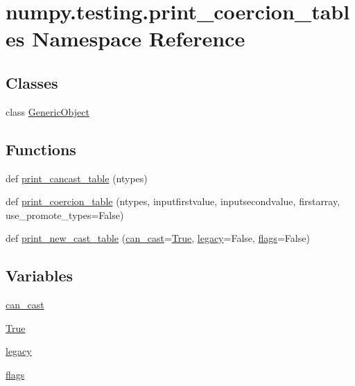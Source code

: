 \hypertarget{namespacenumpy_1_1testing_1_1print__coercion__tables}{}\section{numpy.\+testing.\+print\+\_\+coercion\+\_\+tables Namespace Reference}
\label{namespacenumpy_1_1testing_1_1print__coercion__tables}
\subsection*{Classes}
\begin{DoxyCompactItemize}
\item 
class \hyperlink{classnumpy_1_1testing_1_1print__coercion__tables_1_1GenericObject}{Generic\+Object}
\end{DoxyCompactItemize}
\subsection*{Functions}
\begin{DoxyCompactItemize}
\item 
def \hyperlink{namespacenumpy_1_1testing_1_1print__coercion__tables_ada7e172552cb1df5e53be0b50f1bca31}{print\+\_\+cancast\+\_\+table} (ntypes)
\item 
def \hyperlink{namespacenumpy_1_1testing_1_1print__coercion__tables_ad68b7f2e98abd0e32231b5580582ba5c}{print\+\_\+coercion\+\_\+table} (ntypes, inputfirstvalue, inputsecondvalue, firstarray, use\+\_\+promote\+\_\+types=False)
\item 
def \hyperlink{namespacenumpy_1_1testing_1_1print__coercion__tables_adb5025415683d1a674fa5439c213fe11}{print\+\_\+new\+\_\+cast\+\_\+table} (\hyperlink{namespacenumpy_1_1testing_1_1print__coercion__tables_a4349f89959a8c0befce74c6519fcbbf2}{can\+\_\+cast}=\hyperlink{namespacenumpy_1_1testing_1_1print__coercion__tables_ac440a53da5241e6e64ad1e0da00c6abb}{True}, \hyperlink{namespacenumpy_1_1testing_1_1print__coercion__tables_a4934c6570cfd0a949260a4c81981dcab}{legacy}=False, \hyperlink{namespacenumpy_1_1testing_1_1print__coercion__tables_addc42039913afa565c867a0cfd93b195}{flags}=False)
\end{DoxyCompactItemize}
\subsection*{Variables}
\begin{DoxyCompactItemize}
\item 
\hyperlink{namespacenumpy_1_1testing_1_1print__coercion__tables_a4349f89959a8c0befce74c6519fcbbf2}{can\+\_\+cast}
\item 
\hyperlink{namespacenumpy_1_1testing_1_1print__coercion__tables_ac440a53da5241e6e64ad1e0da00c6abb}{True}
\item 
\hyperlink{namespacenumpy_1_1testing_1_1print__coercion__tables_a4934c6570cfd0a949260a4c81981dcab}{legacy}
\item 
\hyperlink{namespacenumpy_1_1testing_1_1print__coercion__tables_addc42039913afa565c867a0cfd93b195}{flags}
\end{DoxyCompactItemize}


